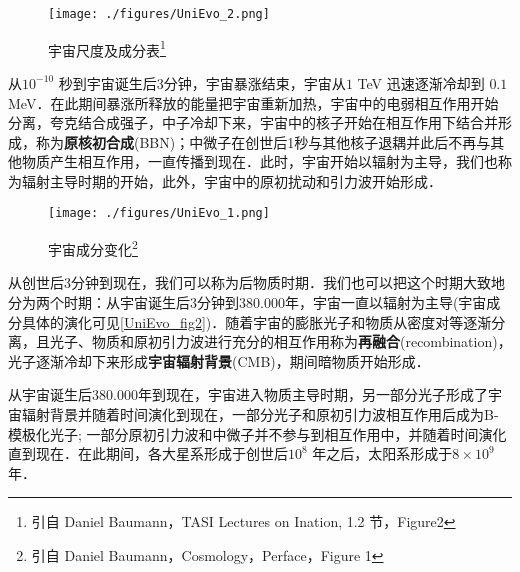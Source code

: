 \begin{figure}[ht]
\centering
\texttt{[image: ./figures/UniEvo\_2.png]}
\caption{宇宙尺度及成分表\footnote{引自 Daniel Baumann，TASI Lectures on Ination, 1.2 节，Figure2}} \label{UniEvo_fig1}
\end{figure}

从$10^{-10}$ 秒到宇宙诞生后3分钟，宇宙暴涨结束，宇宙从$1$ TeV 迅速逐渐冷却到 $0.1 $ MeV．在此期间暴涨所释放的能量把宇宙重新加热，宇宙中的电弱相互作用开始分离，夸克结合成强子，中子冷却下来，宇宙中的核子开始在相互作用下结合并形成，称为\textbf{原核初合成}(BBN)；中微子在创世后1秒与其他核子退耦并此后不再与其他物质产生相互作用，一直传播到现在．此时，宇宙开始以辐射为主导，我们也称为辐射主导时期的开始，此外，宇宙中的原初扰动和引力波开始形成．

\begin{figure}[ht]
\centering
\texttt{[image: ./figures/UniEvo\_1.png]}
\caption{宇宙成分变化\footnote{引自 Daniel Baumann，Cosmology，Perface，Figure 1}} \label{UniEvo_fig2}
\end{figure}

从创世后3分钟到现在，我们可以称为后物质时期．我们也可以把这个时期大致地分为两个时期：从宇宙诞生后3分钟到380.000年，宇宙一直以辐射为主导(宇宙成分具体的演化可见\autoref{UniEvo_fig2})．随着宇宙的膨胀光子和物质从密度对等逐渐分离，且光子、物质和原初引力波进行充分的相互作用称为\textbf{再融合}(recombination)，光子逐渐冷却下来形成\textbf{宇宙辐射背景}(CMB)，期间暗物质开始形成．

从宇宙诞生后380.000年到现在，宇宙进入物质主导时期，另一部分光子形成了宇宙辐射背景并随着时间演化到现在，一部分光子和原初引力波相互作用后成为B-模极化光子; 一部分原初引力波和中微子并不参与到相互作用中，并随着时间演化直到现在．在此期间，各大星系形成于创世后$10^8$ 年之后，太阳系形成于$8\times 10^9$年．




